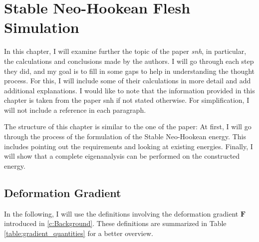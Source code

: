 \chapter{Stable Neo-Hookean Flesh Simulation} \label{c:Paper}
In this chapter, I will examine further the topic of the paper \textit{\acrshort{snh}}, in particular, the calculations and conclusions made by the authors. I will go through each step they did, and my goal is to fill in some gaps to help in understanding the thought process. For this, I will include some of their calculations in more detail and add additional explanations. I would like to note that the information provided in this chapter is taken from the paper \acrshort{snh} if not stated otherwise. For simplification, I will not include a reference in each paragraph. 

The structure of this chapter is similar to the one of the paper: At first, I will go through the process of the formulation of the Stable Neo-Hookean energy. This includes pointing out the requirements and looking at existing energies. Finally, I will show that a complete eigenanalysis can be performed on the constructed energy.

\section{Deformation Gradient}
In the following, I will use the definitions involving the deformation gradient $\mathbf{F}$ introduced in \autoref{c:Background}. These definitions are summarized in Table \ref{table:gradient_quantities} for a better overview.

